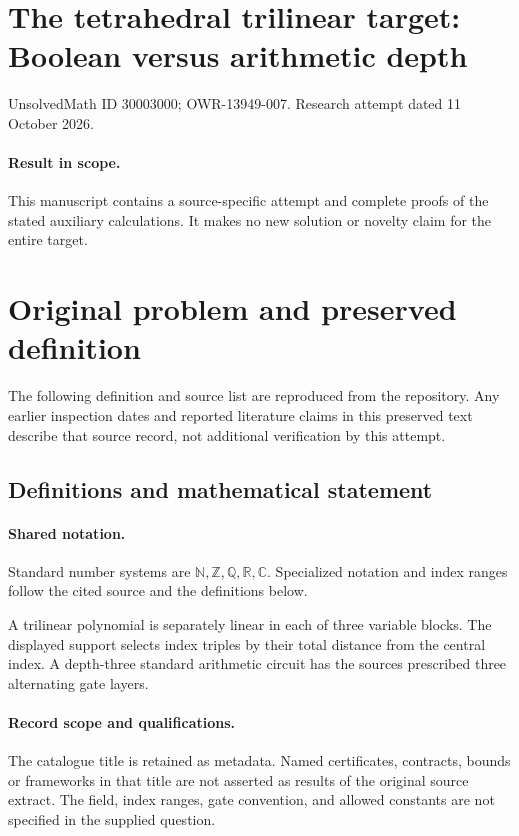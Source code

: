 \documentclass[11pt]{article}
\begin{document}
\section*{The tetrahedral trilinear target: Boolean versus arithmetic depth}
\noindent UnsolvedMath ID 30003000; OWR-13949-007. Research attempt dated 11 October 2026.
\paragraph{Result in scope.}This manuscript contains a source-specific attempt and complete proofs of the stated auxiliary calculations. It makes no new solution or novelty claim for the entire target.
\section{Original problem and preserved definition}
The following definition and source list are reproduced from the repository. Any earlier inspection dates and reported literature claims in this preserved text describe that source record, not additional verification by this attempt.
\subsection{Definitions and mathematical statement}

\paragraph{Shared notation.}Standard number systems are $\mathbb N,\mathbb Z,\mathbb Q,\mathbb R,\mathbb C$. Specialized notation and index ranges follow the cited source and the definitions below.


A trilinear polynomial is separately linear in each of three variable blocks. The displayed support selects index triples by their total distance from the central index. A depth-three standard arithmetic circuit has the source\textquotesingle s prescribed three alternating gate layers.
\paragraph{Record scope and qualifications.}
The catalogue title is retained as metadata. Named certificates, contracts, bounds or frameworks in that title are not asserted as results of the original source extract.
The field, index ranges, gate convention, and allowed constants are not specified in the supplied question.
\end{document}
